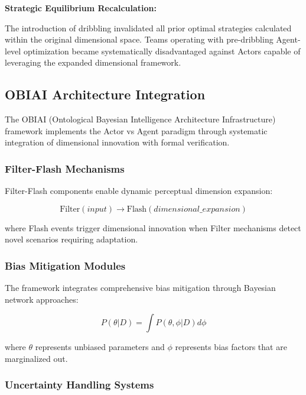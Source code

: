 \documentclass[12pt,a4paper]{article}
\begin{document}
\textbf{Strategic Equilibrium Recalculation:}

The introduction of dribbling invalidated all prior optimal strategies calculated within the original dimensional space. Teams operating with pre-dribbling Agent-level optimization became systematically disadvantaged against Actors capable of leveraging the expanded dimensional framework.

\subsection{OBIAI Architecture Integration}

The OBIAI (Ontological Bayesian Intelligence Architecture Infrastructure) framework implements the Actor vs Agent paradigm through systematic integration of dimensional innovation with formal verification.

\subsubsection{Filter-Flash Mechanisms}

Filter-Flash components enable dynamic perceptual dimension expansion:

\begin{equation}
\text{Filter}(input) \rightarrow \text{Flash}(dimensional\_expansion)
\end{equation}

where Flash events trigger dimensional innovation when Filter mechanisms detect novel scenarios requiring adaptation.

\subsubsection{Bias Mitigation Modules}

The framework integrates comprehensive bias mitigation through Bayesian network approaches:

\begin{equation}
P(\theta|D) = \int P(\theta, \phi|D) d\phi
\end{equation}

where $\theta$ represents unbiased parameters and $\phi$ represents bias factors that are marginalized out.

\subsubsection{Uncertainty Handling Systems}
\end{document}
